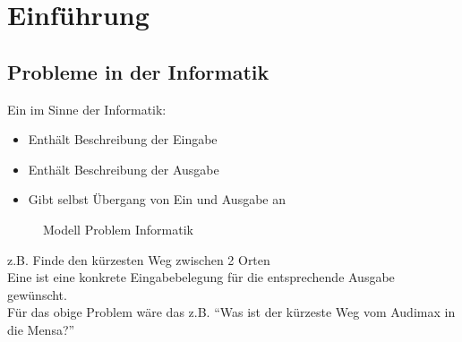 \documentclass[
    12pt,
    a4paper,
    ngerman,
    color=3b,%
    marginpar=false,
    colorback=false,
    leqno,
]{tudaexercise}
\begin{document}
\section{Einführung}\label{1}\label{Einfuehrung}
\subsection{Probleme in der Informatik}\label{1.1}
Ein  im Sinne der Informatik:
\begin{itemize}
    \item Enthält Beschreibung der Eingabe
    \item Enthält Beschreibung der Ausgabe
    \item Gibt selbst  Übergang von Ein und Ausgabe an
\end{itemize}
\begin{figure}[ht]
    \centering
    \caption{Modell Problem Informatik}
    \label{fig:modell-problem-informatik}
\end{figure}
z.B. Finde den kürzesten Weg zwischen 2 Orten\\
Eine  ist eine konkrete Eingabebelegung für die entsprechende Ausgabe gewünscht.\\
Für das obige Problem wäre das z.B. "`Was ist der kürzeste Weg vom Audimax in die Mensa?"'
\end{document}
